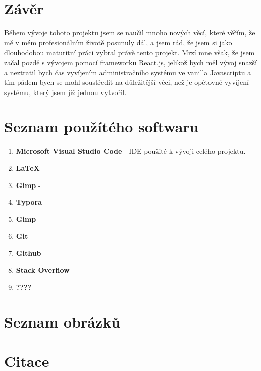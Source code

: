 \documentclass[12pt,a4paper]{report}
\begin{document}
  \chapter{Závěr}
  Během vývoje tohoto projektu jsem se naučil mnoho nových věcí, které věřím, že mě v mém
  profesionálním životě posunuly dál, a jsem rád, že jsem si jako dlouhodobou maturitní práci
  vybral právě tento projekt. Mrzí mne však, že jsem začal pozdě s vývojem pomocí frameworku
  React.js, jelikož bych měl vývoj snazší a neztratil bych čas vyvíjením administračního systému ve
  vanilla Javascriptu a tím pádem bych se mohl soustředit na důležitější věci, než je opětovné
  vyvíjení systému, který jsem již jednou vytvořil.
 
  \chapter{Seznam použítého softwaru}
    \begin{enumerate}
      \item \textbf{Microsoft Visual Studio Code} - IDE použité k vývoji celého projektu.   
      \item \textbf{LaTeX} - 
      \item \textbf{Gimp} - 
      \item \textbf{Typora} - 
      \item \textbf{Gimp} -  
      \item \textbf{Git} -  
      \item \textbf{Github} -  
      \item \textbf{Stack Overflow} -  
      \item \textbf{????} - 
    \end{enumerate}
  \chapter{Seznam obrázků}
 
 
  \chapter{Citace}
\end{document}

